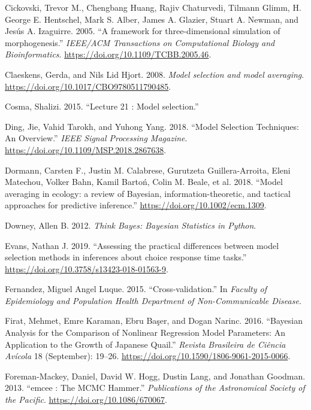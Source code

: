 \documentclass[12pt,]{article}
\begin{document}
\leavevmode\hypertarget{ref-Cickovski2005}{}%
Cickovski, Trevor M., Chengbang Huang, Rajiv Chaturvedi, Tilmann Glimm, H. George E. Hentschel, Mark S. Alber, James A. Glazier, Stuart A. Newman, and Jesús A. Izaguirre. 2005. ``A framework for three-dimensional simulation of morphogenesis.'' \emph{IEEE/ACM Transactions on Computational Biology and Bioinformatics}. \url{https://doi.org/10.1109/TCBB.2005.46}.

\leavevmode\hypertarget{ref-Claeskens2008}{}%
Claeskens, Gerda, and Nils Lid Hjort. 2008. \emph{Model selection and model averaging}. \url{https://doi.org/10.1017/CBO9780511790485}.

\leavevmode\hypertarget{ref-Cosma2015}{}%
Cosma, Shalizi. 2015. ``Lecture 21 : Model selection.''

\leavevmode\hypertarget{ref-Ding2018}{}%
Ding, Jie, Vahid Tarokh, and Yuhong Yang. 2018. ``Model Selection Techniques: An Overview.'' \emph{IEEE Signal Processing Magazine}. \url{https://doi.org/10.1109/MSP.2018.2867638}.

\leavevmode\hypertarget{ref-Dormann2018}{}%
Dormann, Carsten F., Justin M. Calabrese, Gurutzeta Guillera-Arroita, Eleni Matechou, Volker Bahn, Kamil Bartoń, Colin M. Beale, et al. 2018. ``Model averaging in ecology: a review of Bayesian, information-theoretic, and tactical approaches for predictive inference.'' \url{https://doi.org/10.1002/ecm.1309}.

\leavevmode\hypertarget{ref-Downey2012}{}%
Downey, Allen B. 2012. \emph{Think Bayes: Bayesian Statistics in Python}.

\leavevmode\hypertarget{ref-Evans2019}{}%
Evans, Nathan J. 2019. ``Assessing the practical differences between model selection methods in inferences about choice response time tasks.'' \url{https://doi.org/10.3758/s13423-018-01563-9}.

\leavevmode\hypertarget{ref-Fernandez2015}{}%
Fernandez, Miguel Angel Luque. 2015. ``Cross-validation.'' In \emph{Faculty of Epidemiology and Population Health Department of Non-Communicable Disease.}

\leavevmode\hypertarget{ref-Firat2016}{}%
Firat, Mehmet, Emre Karaman, Ebru Başer, and Dogan Narinc. 2016. ``Bayesian Analysis for the Comparison of Nonlinear Regression Model Parameters: An Application to the Growth of Japanese Quail.'' \emph{Revista Brasileira de Ciência Avícola} 18 (September): 19--26. \url{https://doi.org/10.1590/1806-9061-2015-0066}.

\leavevmode\hypertarget{ref-Foreman-Mackey2013}{}%
Foreman-Mackey, Daniel, David W. Hogg, Dustin Lang, and Jonathan Goodman. 2013. ``emcee : The MCMC Hammer.'' \emph{Publications of the Astronomical Society of the Pacific}. \url{https://doi.org/10.1086/670067}.
\end{document}
